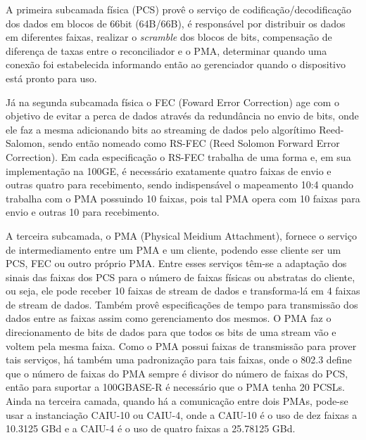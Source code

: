 \documentclass[a4paper,12pt]{article}
\begin{document}
A primeira subcamada física (PCS) provê o serviço de codificação/decodificação dos dados em blocos de 66bit (64B/66B), é responsável por distribuir os dados em diferentes faixas, realizar o \textit{scramble} dos blocos de bits, compensação de diferença de taxas entre o reconciliador e o PMA, determinar quando uma conexão foi estabelecida informando então ao gerenciador quando o dispositivo está pronto para uso. 


Já na segunda subcamada física o FEC (Foward Error Correction) age com o objetivo de evitar a perca de dados através da redundância no envio de bits, onde ele faz a mesma adicionando bits ao streaming de dados pelo algorítimo Reed-Salomon, sendo então nomeado como RS-FEC (Reed Solomon Forward Error Correction). Em cada especificação o RS-FEC trabalha de uma forma e, em sua implementação na 100GE, é necessário exatamente quatro faixas de envio e outras quatro para recebimento, sendo indispensável o mapeamento 10:4 quando trabalha com o PMA possuindo 10 faixas, pois tal PMA opera com 10 faixas para envio e outras 10 para recebimento.

A terceira subcamada, o PMA (Physical Meidium Attachment), fornece o serviço de intermediamento entre um PMA e um cliente, podendo esse cliente ser um PCS, FEC ou outro próprio PMA. Entre esses serviços têm-se a adaptação dos sinais das faixas dos PCS para o número de faixas físicas ou abstratas do cliente, ou seja, ele pode receber 10 faixas de stream de dados e transforma-lá em 4 faixas de stream de dados. Também provê especificações de tempo para transmissão dos dados entre as faixas assim como gerenciamento dos mesmos. O PMA faz o direcionamento de bits de dados para que todos os bits de uma stream vão e voltem pela mesma faixa. Como o PMA possui faixas de transmissão para prover tais serviços, há também uma padronização para tais faixas, onde o 802.3 define que o número de faixas do PMA sempre é divisor do número de faixas do PCS, então para suportar a 100GBASE-R é necessário que o PMA tenha 20 PCSLs. Ainda na terceira camada, quando há a comunicação entre dois PMAs, pode-se usar a instanciação CAIU-10 ou CAIU-4, onde a CAIU-10 é o uso de dez faixas a 10.3125 GBd e a CAIU-4 é o uso de quatro faixas a 25.78125 GBd.
\end{document}

